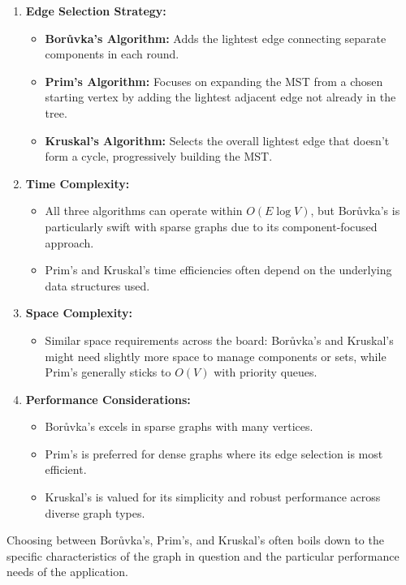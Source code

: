 \documentclass[12pt]{book} %
\begin{document}
\begin{enumerate}
    \item \textbf{Edge Selection Strategy:}
    \begin{itemize}
        \item \textbf{Borůvka's Algorithm:} Adds the lightest edge connecting separate components in each round.
        \item \textbf{Prim's Algorithm:} Focuses on expanding the MST from a chosen starting vertex by adding the lightest adjacent edge not already in the tree.
        \item \textbf{Kruskal's Algorithm:} Selects the overall lightest edge that doesn’t form a cycle, progressively building the MST.
    \end{itemize}

    \item \textbf{Time Complexity:}
    \begin{itemize}
        \item All three algorithms can operate within \(O(E \log V)\), but Borůvka's is particularly swift with sparse graphs due to its component-focused approach.
        \item Prim's and Kruskal's time efficiencies often depend on the underlying data structures used.
    \end{itemize}

    \item \textbf{Space Complexity:}
    \begin{itemize}
        \item Similar space requirements across the board: Borůvka's and Kruskal's might need slightly more space to manage components or sets, while Prim's generally sticks to \(O(V)\) with priority queues.
    \end{itemize}

    \item \textbf{Performance Considerations:}
    \begin{itemize}
        \item Borůvka's excels in sparse graphs with many vertices.
        \item Prim's is preferred for dense graphs where its edge selection is most efficient.
        \item Kruskal's is valued for its simplicity and robust performance across diverse graph types.
    \end{itemize}
\end{enumerate}

Choosing between Borůvka's, Prim's, and Kruskal's often boils down to the specific characteristics of the graph in question and the particular performance needs of the application.
\end{document}
